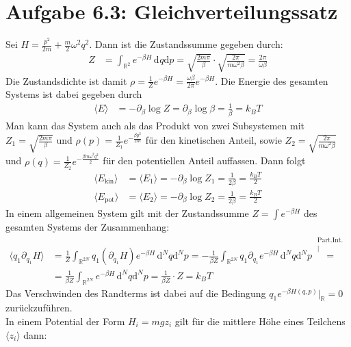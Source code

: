 \documentclass[a4paper,12pt]{article}
\newcommand{\bra}{}
\newcommand{\kom}{}
\newcommand{\intr}{}
\newcommand{\tecxt}{}
\begin{document}
\section*{Aufgabe 6.3: Gleichverteilungssatz}
Sei $H=\frac{p^2}{2m}+\frac{m}{2}\omega^2q^2$. Dann ist die Zustandssumme gegeben durch:
\begin{align*}
Z&=\intr\int_{\mathbb{R}^{2}}{e^{-\beta H}}\,\mathrm{d}^{}q\mathrm{d}p=\sqrt{\frac{2m\pi}{\beta}}\cdot\sqrt{\frac{2\pi}{m\omega^2\beta}}=\frac{2\pi}{\omega\beta}
\end{align*}
Die Zustandsdichte ist damit $\rho=\frac{1}{Z}e^{-\beta H}=\frac{\omega\beta}{2\pi}e^{-\beta H}$. Die Energie des gesamten Systems ist dabei gegeben durch 
\begin{align*}
\bra\langle {E}\rangle&=-\partial_\beta\log Z=\partial_\beta\log\beta=\frac{1}{\beta}=k_BT
\end{align*}
Man kann das System auch als das Produkt von zwei Subsystemen mit $Z_1=\sqrt{\frac{2m\pi}{\beta}}$ und $\rho(p)=\frac{1}{Z_1}e^{-\frac{\beta p^2}{2m}}$ für den kinetischen Anteil, sowie $Z_2=\sqrt{\frac{2\pi}{m\omega^2\beta}}$ und $\rho(q)=\frac{1}{Z_2}e^{-\frac{\beta m\omega^2q^2}{2}}$ für den potentiellen Anteil auffassen. Dann folgt 
\begin{align*}
\bra\langle {E_\tecxt\text{kin}}\rangle&=\bra\langle {E_1}\rangle=-\partial_\beta\log Z_1=\frac{1}{2\beta}=\frac{k_BT}{2}\\
\bra\langle {E_\tecxt\text{pot}}\rangle&=\bra\langle {E_2}\rangle=-\partial_\beta\log Z_2=\frac{1}{2\beta}=\frac{k_BT}{2}
\end{align*}
In einem allgemeinen System gilt mit der Zustandssumme $Z=\int e^{-\beta H}$ des gesamten Systems der Zusammenhang:  
\begin{align*}
\bra\langle {q_1\partial_{q_1}H}\rangle&=\frac{1}{Z}\intr\int_{\mathbb{R}^{2N}}{q_1(\partial_{q_1}H)e^{-\beta H}}\,\mathrm{d}^{N}q\mathrm{d}^Np=-\frac{1}{\beta Z}\intr\int_{\mathbb{R}^{2N}}{q_1\partial_{q_1}e^{-\beta H}}\,\mathrm{d}^{N}q\mathrm{d}^Np\kom\overset{\substack{{\tecxt\text{Part.Int.}} \\ |}}{=}\\
&=\frac{1}{\beta Z}\intr\int_{\mathbb{R}^{2N}}{e^{-\beta H}}\,\mathrm{d}^{N}q\mathrm{d}^Np=\frac{1}{\beta Z}\cdot Z=k_BT
\end{align*}
Das Verschwinden des Randterms ist dabei auf die Bedingung $q_1e^{-\beta H(q,p)}\big\vert_\mathbb{R}=0$ zurückzuführen.\\
In einem Potential der Form $H_i=mgz_i$ gilt für die mittlere Höhe eines Teilchens $\bra\langle {z_i}\rangle$ dann:
\end{document}
